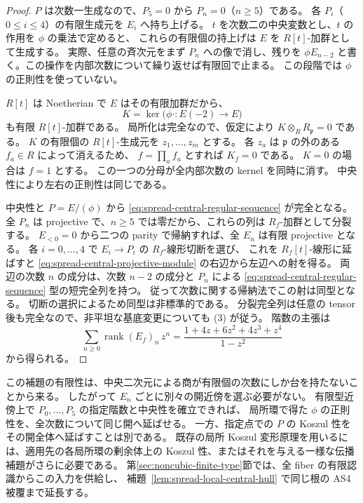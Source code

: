 \begin{proof}
$P$ は次数一生成なので、$P_5=0$ から $P_n=0$（$n\ge5$）である。
各 $P_i$（$0\le i\le4$）の有限生成元を $E_i$ へ持ち上げる。
$t$ を次数二の中央変数とし、$t$ の作用を $\phi$ の乗法で定めると、
これらの有限個の持上げは $E$ を $R[t]$-加群として生成する。
実際、任意の斉次元をまず $P_n$ への像で消し、残りを
$\phi E_{n-2}$ と書く。この操作を内部次数について繰り返せば有限回で止まる。
この段階では $\phi$ の正則性を使っていない。

$R[t]$ は Noetherian で $E$ はその有限加群だから、
\[
 K=\ker\bigl(\phi\cdot:E(-2)\longrightarrow E\bigr)
\]
も有限 $R[t]$-加群である。
局所化は完全なので、仮定により $K\otimes_RR_{\mathfrak p}=0$ である。
$K$ の有限個の $R[t]$-生成元を $z_1,\ldots,z_m$ とする。
各 $z_a$ は $\mathfrak p$ の外のある $f_a\in R$ によって消えるため、
$f=\prod_af_a$ とすれば $K_f=0$ である。
$K=0$ の場合は $f=1$ とする。
この一つの分母が全内部次数の kernel を同時に消す。
中央性により左右の正則性は同じである。

中央性と $P=E/(\phi)$ から
\eqref{eq:spread-central-regular-sequence} が完全となる。
全 $P_n$ は projective で、$n\ge5$ では零だから、これらの列は
$R_f$-加群として分裂する。
$E_{<0}=0$ から二つの parity で帰納すれば、全 $E_n$ は有限 projective となる。
各 $i=0,\ldots,4$ で $E_i\to P_i$ の $R_f$-線形切断を選び、
これを $R_f[t]$-線形に延ばすと \eqref{eq:spread-central-projective-module} の右辺から左辺への射を得る。
両辺の次数 $n$ の成分は、次数 $n-2$ の成分と $P_n$ による
\eqref{eq:spread-central-regular-sequence} 型の短完全列を持つ。
従って次数に関する帰納法でこの射は同型となる。
切断の選択によるため同型は非標準的である。
分裂完全列は任意の tensor 後も完全なので、非平坦な基底変更についても (3) が従う。
階数の主張は
\[
 \sum_{n\ge0}\operatorname{rank}(E_f)_n\,z^n
 =\frac{1+4z+6z^2+4z^3+z^4}{1-z^2}
\]
から得られる。
\end{proof}

\begin{remark}
この補題の有限性は、中央二次元による商が有限個の次数にしか台を持たないことから来る。
したがって $E_n$ ごとに別々の開近傍を選ぶ必要がない。
有限型近傍上で $P_0,\ldots,P_5$ の指定階数と中央性を確立できれば、
局所環で得た $\phi$ の正則性を、全次数について同じ開へ延ばせる。
一方、指定点での $P$ の Koszul 性をその開全体へ延ばすことは別である。
既存の局所 Koszul 変形原理を用いるには、適用先の各局所環の剰余体上の
Koszul 性、またはそれを与える一様な伝播補題がさらに必要である。
第\ref{sec:noncubic-finite-type}節では、全 fiber の有限認識からこの入力を供給し、
補題~\ref{lem:spread-local-central-hull} で同じ根の AS4 被覆まで延長する。
\end{remark}
